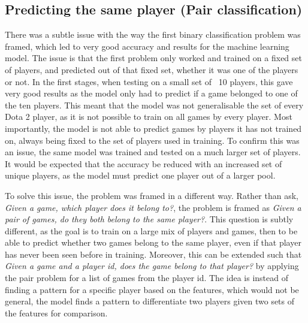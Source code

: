 \documentclass{SizheArticle}
\begin{document}




\subsection{Predicting the same player (Pair classification)}
There was a subtle issue with the way the first binary classification problem was framed, which led to very good accuracy and results for the machine learning model. The issue is that the first problem only worked and trained on a fixed set of players, and predicted out of that fixed set, whether it was one of the players or not. In the first stages, when testing on a small set of ~10 players, this gave very good results as the model only had to predict if a game belonged to one of the ten players. This meant that the model was not generalisable the set of every Dota 2 player, as it is not possible to train on all games by every player. Most importantly, the model is not able to predict games by players it has not trained on, always being fixed to the set of players used in training. To confirm this was an issue, the same model was trained and tested on a much larger set of players. It would be expected that the accuracy be reduced with an increased set of unique players, as the model must predict one player out of a larger pool.

To solve this issue, the problem was framed in a different way. Rather than ask, \textit{Given a game, which player does it belong to?}, the problem is framed as \textit{Given a pair of games, do they both belong to the same player?}. This question is subtly different, as the goal is to train on a large mix of players and games, then to be able to predict whether two games belong to the same player, even if that player has never been seen before in training. Moreover, this can be extended such that \textit{Given a game and a player id, does the game belong to that player?} by applying the pair problem for a list of games from the player id. The idea is instead of finding a pattern for a specific player based on the features, which would not be general, the model finds a pattern to differentiate two players given two sets of the features for comparison. 
\end{document}

